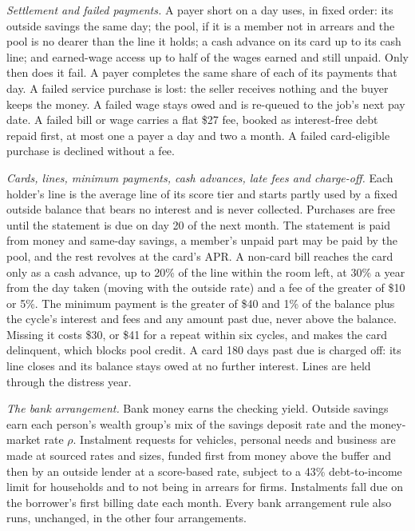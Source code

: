 \emph{Settlement and failed payments.} A payer short on a day uses, in fixed order: its outside savings the same
day; the pool, if it is a member not in arrears and the pool is no dearer than the line it holds; a cash advance on
its card up to its cash line; and earned-wage access up to half of the wages earned and still unpaid. Only then does it
fail. A payer completes the same share of each of its payments that day. A failed service purchase is lost: the
seller receives nothing and the buyer keeps the money. A failed wage stays owed and is re-queued to the job's next
pay date. A failed bill or wage carries a flat \$27 fee, booked as interest-free debt repaid first, at most one a
payer a day and two a month. A failed card-eligible purchase is declined without a fee.

\emph{Cards, lines, minimum payments, cash advances, late fees and charge-off.} Each holder's line is the average
line of its score tier and starts partly used by a fixed outside balance that bears no interest and is never
collected. Purchases are free until the statement is due on day 20 of the next month. The statement is paid from
money and same-day savings, a member's unpaid part may be paid by the pool, and the rest revolves at the card's APR.
A non-card bill reaches the card only as a cash advance, up to 20\% of the line within the room left, at 30\% a
year from the day taken (moving with the outside rate) and a fee of the greater of \$10 or 5\%. The minimum payment
is the greater of \$40 and 1\% of the balance plus the cycle's interest and fees and any amount past due, never
above the balance. Missing it costs \$30, or \$41 for a repeat within six cycles, and makes the card delinquent,
which blocks pool credit. A card 180 days past due is charged off: its line closes and its balance stays owed at no
further interest. Lines are held through the distress year.

\emph{The bank arrangement.} Bank money earns the checking yield. Outside savings earn each person's wealth group's
mix of the savings deposit rate and the money-market rate $\rho$. Instalment requests for vehicles, personal needs
and business are made at sourced rates and sizes, funded first from money above the buffer and then by an outside
lender at a score-based rate, subject to a 43\% debt-to-income limit for households and to not being in arrears for
firms. Instalments fall due on the borrower's first billing date each month. Every bank arrangement rule also runs,
unchanged, in the other four arrangements.

